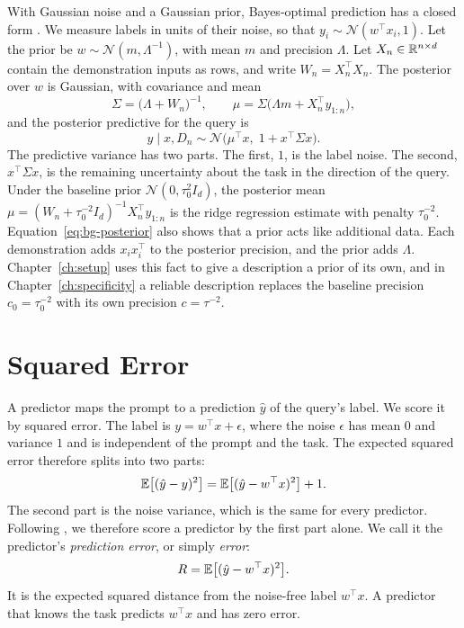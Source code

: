 With Gaussian noise and a Gaussian prior, Bayes-optimal prediction has a closed form \citep[Section~14.8]{gelman2013}. We measure labels in units of their noise, so that $y_i \sim \mathcal{N}(w^\top x_i, 1)$. Let the prior be $w \sim \mathcal{N}(m, \Lambda^{-1})$, with mean $m$ and precision $\Lambda$. Let $X_n \in \mathbb{R}^{n \times d}$ contain the demonstration inputs as rows, and write $W_n = X_n^\top X_n$. The posterior over $w$ is Gaussian, with covariance and mean
\begin{equation}\label{eq:bg-posterior}
    \Sigma = \big(\Lambda + W_n\big)^{-1}, \qquad \mu = \Sigma \big(\Lambda m + X_n^\top y_{1:n}\big),
\end{equation}
and the posterior predictive for the query is
\begin{equation}\label{eq:bg-gauss-predictive}
    y \mid x, D_n \sim \mathcal{N}\big(\mu^\top x,\; 1 + x^\top \Sigma x\big).
\end{equation}
The predictive variance has two parts. The first, $1$, is the label noise. The second, $x^\top \Sigma x$, is the remaining uncertainty about the task in the direction of the query. Under the baseline prior $\mathcal{N}(0, \tau_0^2 I_d)$, the posterior mean $\mu = (W_n + \tau_0^{-2} I_d)^{-1} X_n^\top y_{1:n}$ is the ridge regression estimate with penalty $\tau_0^{-2}$. Equation~\eqref{eq:bg-posterior} also shows that a prior acts like additional data. Each demonstration adds $x_i x_i^\top$ to the posterior precision, and the prior adds $\Lambda$. Chapter~\ref{ch:setup} uses this fact to give a description a prior of its own, and in Chapter~\ref{ch:specificity} a reliable description replaces the baseline precision $c_0=\tau_0^{-2}$ with its own precision $c=\tau^{-2}$.

\section{Squared Error}\label{sec:bg-regret}
A predictor maps the prompt to a prediction $\hat y$ of the query's label. We score it by squared error. The label is $y = w^\top x + \epsilon$, where the noise $\epsilon$ has mean $0$ and variance $1$ and is independent of the prompt and the task. The expected squared error therefore splits into two parts:
\begin{equation}\label{eq:bg-sq}
    \mathbb{E}\big[(\hat y - y)^2\big] = \mathbb{E}\big[(\hat y - w^\top x)^2\big] + 1 .
\end{equation}
The second part is the noise variance, which is the same for every predictor. Following \citet{garg2022}, we therefore score a predictor by the first part alone. We call it the predictor's \emph{prediction error}, or simply \emph{error}:
\[
    R = \mathbb{E}\big[(\hat y - w^\top x)^2\big].
\]
It is the expected squared distance from the noise-free label $w^\top x$. A predictor that knows the task predicts $w^\top x$ and has zero error.

